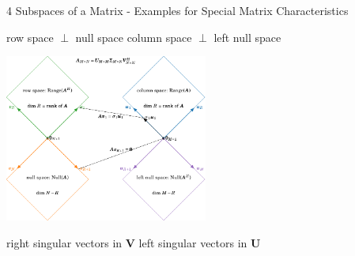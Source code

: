 \documentclass[mathserif, aspectratio=1610]{intbeamer}
\begin{document}
\begin{frame}[label=SubspacesForSketch]{4 Subspaces of a Matrix - Examples for Special Matrix Characteristics}

\hspace{-0.5cm}
\textcolor{C2}{row space} $\perp$ \textcolor{C1}{null space}
\hspace{0.5cm}
\textcolor{C0}{column space} $\perp$ \textcolor{C4}{left null space}

\begin{flushleft}
\includegraphics[width=0.5\textwidth]{four_subspaces.pdf}
\end{flushleft}

\hspace{-0.5cm}
right singular vectors in $\bm{V}$
\hspace{0.5cm}
left singular vectors in $\bm{U}$

\end{frame}
\end{document}
